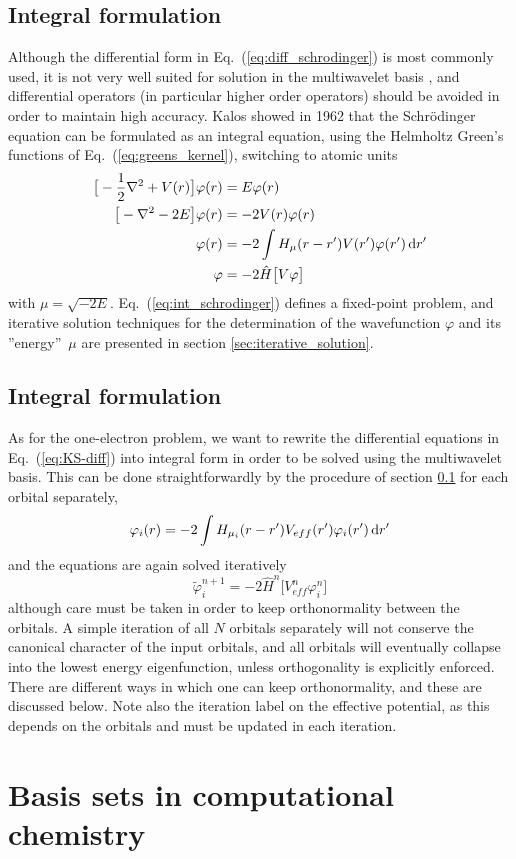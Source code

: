 \subsection{Integral formulation}\label{sec:1_orb_int}
Although the differential form in Eq.~(\ref{eq:diff_schrodinger}) is most 
commonly used, it is not very well suited for solution in the multiwavelet 
basis \cite{Harrison}, and differential operators (in particular higher 
order operators) should be avoided in order to maintain high accuracy. 
Kalos \cite{Kalos} showed in 1962 that the Schr\"{o}dinger equation can 
be formulated as an integral equation, using the Helmholtz Green's functions 
of Eq.~(\ref{eq:greens_kernel}), switching to atomic units
\begin{align}
    \big[-\frac{1}{2}\nabla^2 + V(r)\big]\varphi(r) &= E \varphi(r)\\
    \big[-\nabla^2 - 2E\big]\varphi(r) &= -2V(r) \varphi(r)\\
    \varphi(r) &= -2\int H_{\mu}(r-r')V(r') \varphi(r') \,\mathrm{d} r'\\
    \label{eq:int_schrodinger}
    \varphi &= -2 \hat{H}\big[V\varphi\big]
\end{align}
with $\mu = \sqrt{-2E}$. Eq.~(\ref{eq:int_schrodinger}) defines a fixed-point 
problem, and iterative solution techniques for the determination of the 
wavefunction $\varphi$ and its ''energy'' $\mu$ are presented in section 
\ref{sec:iterative_solution}.


\subsection{Integral formulation}
As for the one-electron problem, we want to rewrite the differential 
equations in Eq.~(\ref{eq:KS-diff}) into integral form in order to be 
solved using the multiwavelet basis. This can be done straightforwardly
by the procedure of section \ref{sec:1_orb_int} for each orbital separately, 
\begin{equation}
    \label{eq:KS-int}
    \varphi_i(r) = -2\int H_{\mu_i}(r-r')V_{eff}(r') \varphi_i(r') \,\mathrm{d} r'
\end{equation}
and the equations are again solved iteratively
\begin{equation}
    \label{eq:KS-iter}
    \tilde{\varphi}^{n+1}_i = -2 \hat{H}^n\big[V^n_{eff}\varphi^n_i\big]
\end{equation}
although care must be taken in order to keep orthonormality between the 
orbitals. A simple iteration of all $N$ orbitals separately will not 
conserve the canonical character of the input orbitals, and all orbitals 
will eventually collapse into the lowest energy eigenfunction, unless 
orthogonality is explicitly enforced. There are different ways in which 
one can keep orthonormality, and these are discussed below. Note also the
iteration label on the effective potential, as this depends on the orbitals 
and must be updated in each iteration.

\section{Basis sets in computational chemistry}

